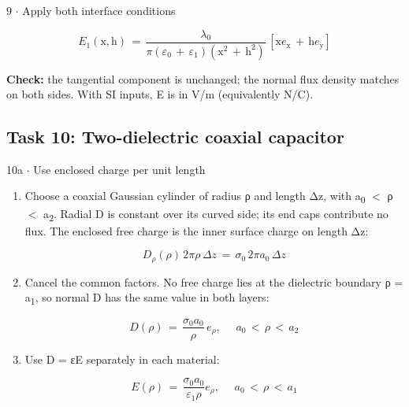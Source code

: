 \documentclass[11pt]{article}
\begin{document}
\begin{keepsection}
\begin{workedbox}{9 \ensuremath{\cdot} Apply both interface conditions}
\begin{enumerate}
\begin{equation*}{E}_{1}(\mathrm{x},\mathrm{h})\, =\, \dfrac{{λ}_{0}}{π({ε}_{0}\, +\, {ε}_{1})(\mathrm{x}^{2}\, +\, \mathrm{h}^{2})}\, [\mathrm{x}{e}_{\mathrm{x}}\, +\, \mathrm{h}{e}_{\mathrm{y}}]\end{equation*}

\textbf{Check:} the tangential component is unchanged; the normal flux density matches on both sides. With SI inputs, E is in V/m (equivalently N/C).
\end{enumerate}
\end{workedbox}

\end{keepsection}
\begin{keepsection}\subsection{Task 10: Two-dielectric coaxial capacitor}

\begin{workedbox}{10a \ensuremath{\cdot} Use enclosed charge per unit length}
\begin{enumerate}
\item {}
Choose a coaxial Gaussian cylinder of radius ρ and length Δz, with a\textsubscript{0} \ensuremath{<} ρ \ensuremath{<} a\textsubscript{2}. Radial D is constant over its curved side; its end caps contribute no flux. The enclosed free charge is the inner surface charge on length Δz:

\begin{equation*}{D}_{ρ}(ρ)\, 2πρ\, Δ{z}\, =\, σ_{0}\, 2π{a}_{0}\, Δ{z}\end{equation*}
\item {}
Cancel the common factors. No free charge lies at the dielectric boundary ρ = a\textsubscript{1}, so normal D has the same value in both layers:

\begin{equation*}{D}(ρ)\, =\, \dfrac{σ_{0}{a}_{0}}{ρ}\, {e}_{ρ},\, \quad \, {a}_{0}\, <\, ρ\, <\, {a}_{2}\end{equation*}
\item {}
Use D = εE separately in each material:

\begin{equation*}{E}(ρ)\, =\, \dfrac{σ_{0}{a}_{0}}{ε_{1}ρ}{e}_{ρ},\, \quad \, {a}_{0}\, <\, ρ\, <\, {a}_{1}\end{equation*}


\end{enumerate}
\end{workedbox}
\end{keepsection}
\end{document}
